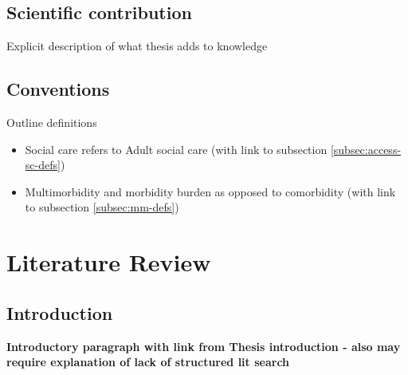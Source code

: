 \documentclass[12pt,]{report}
\providecommand{\tightlist}{%
  \setlength{\itemsep}{0pt}\setlength{\parskip}{0pt}}
\begin{document}
\section{Scientific contribution}\label{sec:intro-contribution}

Explicit description of what thesis adds to knowledge

\section{Conventions}\label{sec:intro-conventions}

Outline definitions

\begin{itemize}
\tightlist
\item
  Social care refers to Adult social care (with link to subsection
  \ref{subsec:access-sc-defs})
\item
  Multimorbidity and morbidity burden as opposed to comorbidity (with
  link to subsection \ref{subsec:mm-defs})
\end{itemize}

\FloatBarrier
\newpage
{}

\chapter{Literature Review}\label{ch:lit-review}

\section{Introduction}\label{sec:lit-review-intro}

\textbf{Introductory paragraph with link from Thesis introduction - also
may require explanation of lack of structured lit search}
\end{document}
